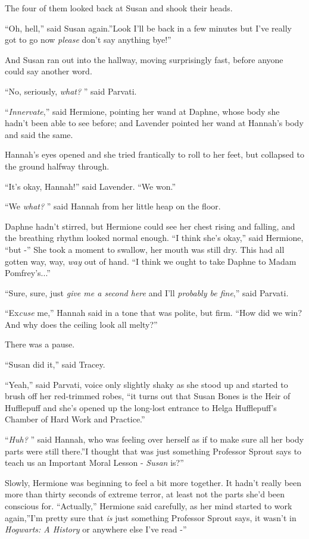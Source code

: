 The four of them looked back at Susan and shook their heads.

``Oh, hell,'' said Susan again.''Look I'll be back in a few minutes but
I've really got to go now \emph{please} don't say anything bye!''

And Susan ran out into the hallway, moving surprisingly fast, before
anyone could say another word.

``No, seriously, \emph{what?} '' said Parvati.

``\emph{Innervate},'' said Hermione, pointing her wand at Daphne, whose
body she hadn't been able to see before; and Lavender pointed her wand
at Hannah's body and said the same.

Hannah's eyes opened and she tried frantically to roll to her feet, but
collapsed to the ground halfway through.

``It's okay, Hannah!'' said Lavender. ``We won.''

``We \emph{what?} '' said Hannah from her little heap on the floor.

Daphne hadn't stirred, but Hermione could see her chest rising and
falling, and the breathing rhythm looked normal enough. ``I think she's
okay,'' said Hermione, ``but -'' She took a moment to swallow, her mouth
was still dry. This had all gotten way, way, \emph{way} out of hand. ``I
think we ought to take Daphne to Madam Pomfrey's...''

``Sure, sure, just \emph{give me a second here} and I'll \emph{probably
be fine},'' said Parvati.

``Ex\emph{cuse} me,'' Hannah said in a tone that was polite, but firm.
``How did we win? And why does the ceiling look all melty?''

There was a pause.

``Susan did it,'' said Tracey.

``Yeah,'' said Parvati, voice only slightly shaky as she stood up and
started to brush off her red-trimmed robes, ``it turns out that Susan
Bones is the Heir of Hufflepuff and she's opened up the long-lost
entrance to Helga Hufflepuff's Chamber of Hard Work and Practice.''

``\emph{Huh?} '' said Hannah, who was feeling over herself as if to make
sure all her body parts were still there.''I thought that was just
something Professor Sprout says to teach us an Important Moral Lesson -
\emph{Susan} is?''

Slowly, Hermione was beginning to feel a bit more together. It hadn't
really been more than thirty seconds of extreme terror, at least not the
parts she'd been conscious for. ``Actually,'' Hermione said carefully,
as her mind started to work again,''I'm pretty sure that \emph{is} just
something Professor Sprout says, it wasn't in \emph{Hogwarts: A History}
or anywhere else I've read -''

